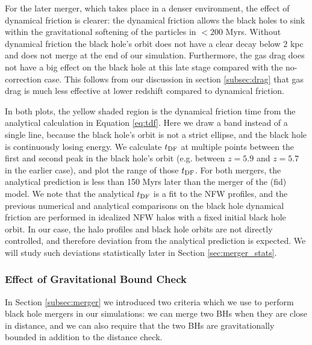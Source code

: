 For the later merger, which takes place in a denser environment, the effect of dynamical friction is clearer: the dynamical friction allows the black holes to sink within the gravitational softening of the particles in $<200$ Myrs. Without dynamical friction the black hole's orbit does not have a clear decay below $2$ kpc and does not merge at the end of our simulation. Furthermore, the gas drag does not have a big effect on the black hole at this late stage compared with the no-correction case. This follows from our discussion in section \ref{subsec:drag} that gas drag is much less effective at lower redshift compared to dynamical friction.
 
In both plots, the yellow shaded region is the dynamical friction time from the analytical calculation in Equation \ref{eq:tdf}. Here we draw a band instead of a single line, because the black hole's orbit is not a strict ellipse, and the black hole is continuously losing energy. We calculate $t_{\rm DF}$ at multiple points between the first and second peak in the black hole's orbit (e.g. between $z=5.9$ and $z=5.7$ in the earlier case), and plot the range of those $t_{\rm DF}$. For both mergers, the analytical prediction is less than 150 Myrs later than the merger of the (fid) model. We note that the \cite{Taffoni2003} analytical $t_{\rm DF}$ is a fit to the NFW profiles, and the previous numerical and analytical comparisons on the black hole dynamical friction\citep[e.g.][]{Tremmel2015,Pfister2019} are performed in idealized NFW halos with a fixed initial black hole orbit. In our case, the halo profiles and black hole orbits are not directly controlled, and therefore deviation from the analytical prediction is expected. We will study such deviations statistically later in Section \ref{sec:merger_stats}.




 \subsubsection{Effect of Gravitational Bound Check}

 In Section \ref{subsec:merger} we introduced two criteria which we use to perform black hole mergers in our simulations: we can merge two BHs when they are close in distance, and we can also require that the two BHs are gravitationally bounded in addition to the distance check. 
 
